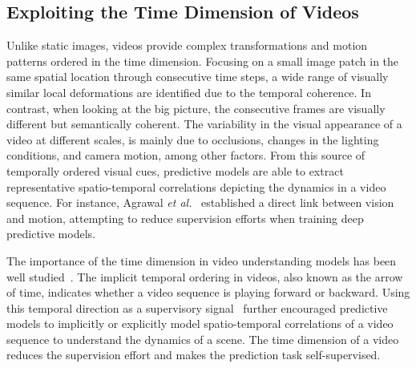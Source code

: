 \subsection{Exploiting the Time Dimension of Videos}
Unlike static images, videos provide complex transformations and motion patterns ordered in the time dimension. Focusing on a small image patch in the same spatial location through consecutive time steps, a wide range of visually similar local deformations are identified due to the temporal coherence. In contrast, when looking at the big picture, the consecutive frames are visually different but semantically coherent. The variability in the visual appearance of a video at different scales, is mainly due to occlusions, changes in the lighting conditions, and camera motion, among other factors. From this source of temporally ordered visual cues, predictive models are able to extract representative spatio-temporal correlations depicting the dynamics in a video sequence. For instance, Agrawal \textit{et al.}~\cite{Agrawal2015} established a direct link between vision and motion, attempting to reduce supervision efforts when training deep predictive models. 

The importance of the time dimension in video understanding models has been well studied~\cite{Huang2018}. The implicit temporal ordering in videos, also known as the arrow of time, indicates whether a video sequence is playing forward or backward. Using this temporal direction as a supervisory signal~\cite{Pickup2014,Misra2016,Wei2018} further encouraged predictive models to implicitly or explicitly model spatio-temporal correlations of a video sequence to understand the dynamics of a scene. The time dimension of a video reduces the supervision effort and makes the prediction task self-supervised.

